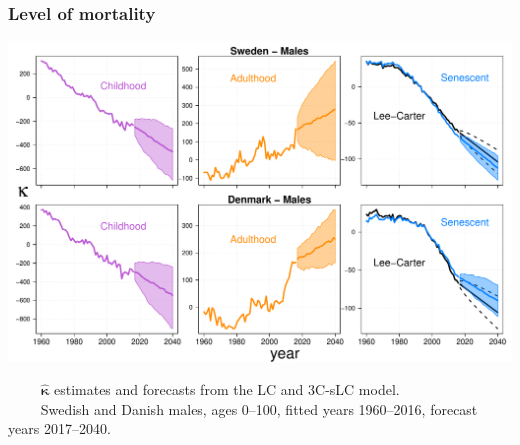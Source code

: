 \documentclass[12pt, xcolor=table]{beamer}  %
\begin{document}
\begin{frame}[noframenumbering]           
	\frametitle{Level of mortality}
	
	\vspace{-0.25cm}
	
	\begin{center}
		\includegraphics[scale=0.41]{Figures/Ch5/KappaFore3_M}
	\end{center}

\vspace{-0.3cm}	
\tiny{$\quad\quad$ $\bm{\hat{\kappa}}$ estimates and forecasts from the LC and 3C-sLC model. \\ $\quad\quad$ Swedish and Danish males, ages 0--100, fitted years 1960--2016, forecast years 2017--2040.}
	
\end{frame}

%	
%
%	
\end{document}

